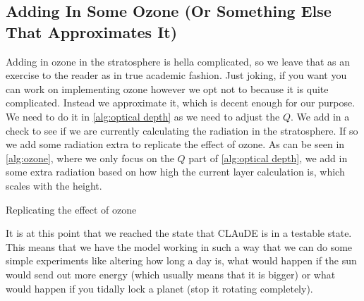 \subsection{Adding In Some Ozone (Or Something Else That Approximates It)}
Adding in ozone in the stratosphere is hella complicated, so we leave that as an exercise to the reader as in true academic fashion. Just joking, if you want you can work on implementing ozone 
however we opt not to because it is quite complicated. Instead we approximate it, which is decent enough for our purpose. We need to do it in \autoref{alg:optical depth} as we need to adjust the
$Q$. We add in a check to see if we are currently calculating the radiation in the stratosphere. If so we add some radiation extra to replicate the effect of ozone. As can be seen in 
\autoref{alg:ozone}, where we only focus on the $Q$ part of \autoref{alg:optical depth}, we add in some extra radiation based on how high the current layer calculation is, which scales with the
height. 

\begin{algorithm}
    \caption{Replicating the effect of ozone}
    \label{alg:ozone}
\end{algorithm}

It is at this point that we reached the state that CLAuDE is in a testable state. This means that we have the model working in such a way that we can do some simple experiments like altering how
long a day is, what would happen if the sun would send out more energy (which usually means that it is bigger) or what would happen if you tidally lock a planet (stop it rotating completely). 